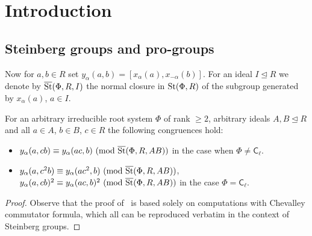 \documentclass[oneside, 11pt]{amsart} \pdfoutput=1
\begin{document}



\newcommand{\Set}{\mathbf{Set}}
\newcommand{\Group}{\mathbf{Grp}}
\newcommand{\Rng}{\mathbf{Rng}}
\newcommand{\Fun}{\mathbf{Fun}}
\newcommand{\Mod}{\mathbf{Mod}}
\newcommand{\op}{\mathrm{op}}
\newcommand{\ZZ}{\mathbb{Z}}

\newcommand{\otimeshat}{\mathbin{\widehat{\otimes}}}

\newcommand{\up}[2]{{^{#1}\!{#2}}}

\newcommand{\rA}{\mathsf{A}}
\newcommand{\rB}{\mathsf{B}}
\newcommand{\rC}{\mathsf{C}}
\newcommand{\rD}{\mathsf{D}}
\newcommand{\rE}{\mathsf{E}}
\newcommand{\rF}{\mathsf{F}}
\newcommand{\rG}{\mathsf{G}}

\newcommand{\catname}[1]{{\normalfont\textbf{#1}}} %

\section{Introduction}
\subsection{Steinberg groups and pro-groups}

Now for $a, b \in R$ set $y_\alpha(a, b) = [x_\alpha(a), x_{-\alpha}(b)]$.
For an ideal $I \trianglelefteq R$ we denote by $\overline{\mathop{\mathrm{St}}\nolimits}(\Phi, R, I)$ the normal closure in $\mathop{\mathrm{St}}\nolimits(\Phi, R)$ of the subgroup generated by $x_\alpha(a)$, $a\in I$.

\begin{lemma} \label{lem:c-identities} For an arbitrary irreducible root system $\Phi$ of rank $\geq 2$, arbitrary ideals $A, B \trianglelefteq R$ and all $a \in A$, $b \in B$, $c \in R$ the following congruences hold:
\begin{itemize}
 \item $y_\alpha(a, cb) \equiv y_\alpha(ac, b)\ (\mathrm{mod}\ \overline{\mathop{\mathrm{St}}\nolimits}(\Phi, R, AB))$ in the case when $\Phi \neq \rC_{\ell}$.
 \item $y_\alpha(a, c^2b) \equiv y_\alpha(ac^2, b)\ (\mathrm{mod}\ \overline{\mathop{\mathrm{St}}\nolimits}(\Phi, R, AB))$, $y_\alpha(a, cb)^2 \equiv y_\alpha(ac, b)^2\ (\mathrm{mod}\ \overline{\St}(\Phi, R, AB))$ in the case $\Phi = \rC_{\ell}$.
\end{itemize} \end{lemma}
\begin{proof}
 Observe that the proof of~\cite[Theorem~5]{VZ20} is based solely on computations with Chevalley commutator formula, which all can be reproduced verbatim in the context of Steinberg groups.
\end{proof}
\end{document}
